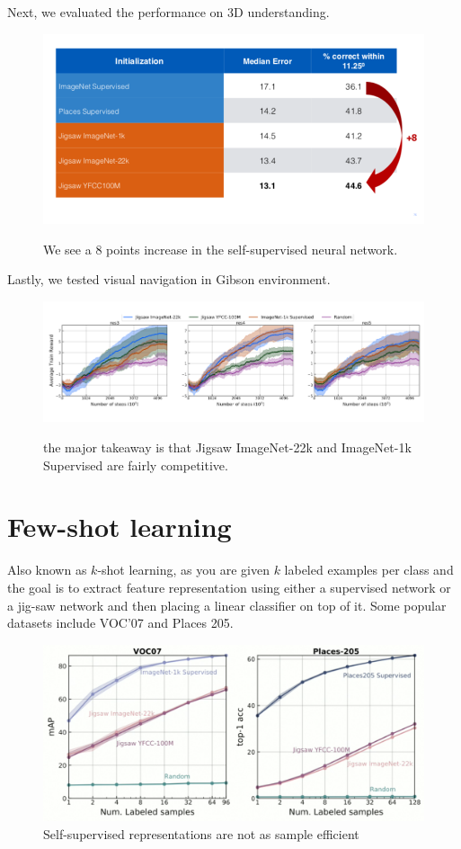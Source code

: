 Next, we evaluated the performance on 3D understanding.

\begin{figure}[H]
\centering
\includegraphics[width=0.8\linewidth]{figs/3dunderstanding.png}
\label{fig:3dunderstanding}
\caption{We see a 8 points increase in the self-supervised neural network.}
\end{figure}

Lastly, we tested visual navigation in Gibson environment.

\begin{figure}[H]
\centering
\includegraphics[width=0.8\linewidth]{figs/gibson.png}
\label{fig:gibson}
\caption{the major takeaway is that Jigsaw ImageNet-22k and ImageNet-1k Supervised are fairly competitive.}
\end{figure}

\section{Few-shot learning}

Also known as $k$-shot learning, as you are given $k$ labeled examples per class and the goal is to extract feature representation using either a supervised network or a jig-saw network and then placing a linear classifier on top of it. Some popular datasets include VOC’07 and Places 205.

\begin{figure}[H]
\centering
\includegraphics[width=0.8\linewidth]{figs/Self_supervised.png}
\caption{Self-supervised representations are not as sample efficient}\label{fig:Self_supervised}
\end{figure}



